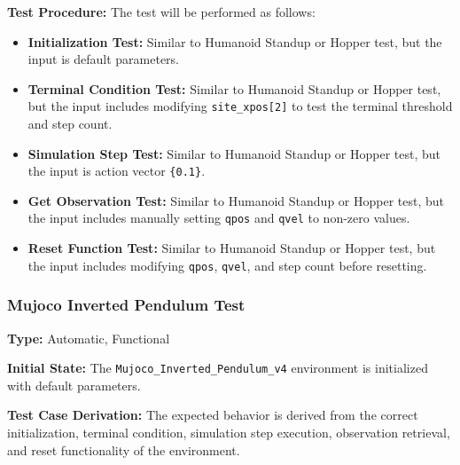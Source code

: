 \documentclass[12pt, titlepage]{article}
\begin{document}
\textbf{Test Procedure:} The test will be performed as follows:
\begin{itemize}
    \item \textbf{Initialization Test:} Similar to Humanoid Standup or Hopper test, but the input is default parameters.
    
    \item \textbf{Terminal Condition Test:} Similar to Humanoid Standup or Hopper test, but the input includes modifying \texttt{site\_xpos[2]} to test the terminal threshold and step count.
    
    \item \textbf{Simulation Step Test:} Similar to Humanoid Standup or Hopper test, but the input is action vector \texttt{\{0.1\}}.
    
    \item \textbf{Get Observation Test:} Similar to Humanoid Standup or Hopper test, but the input includes manually setting \texttt{qpos} and \texttt{qvel} to non-zero values.
    
    \item \textbf{Reset Function Test:} Similar to Humanoid Standup or Hopper test, but the input includes modifying \texttt{qpos}, \texttt{qvel}, and step count before resetting.
\end{itemize}


\subsubsection{Mujoco Inverted Pendulum Test\\}

\textbf{Type:} Automatic, Functional

\textbf{Initial State:} The \texttt{Mujoco\_Inverted\_Pendulum\_v4} environment is initialized with default parameters.

\textbf{Test Case Derivation:} The expected behavior is derived from the correct initialization, terminal condition, simulation step execution, observation retrieval, and reset functionality of the environment.
\end{document}

